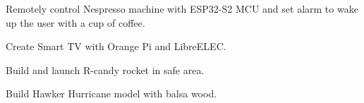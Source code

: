 \documentclass[10pt,a4paper,ragged2e,withhyper]{altacv}
\begin{document}
\begin{paracol}{2}
{\small Remotely control Nespresso machine with ESP32-S2 MCU and set alarm to wake up the user with a cup of coffee.}

\divider

\small Create Smart TV with Orange Pi and LibreELEC.

\divider

\small Build and launch R-candy rocket in safe area.

\divider

\small Build Hawker Hurricane model with balsa wood.










\divider

\divider

\divider











\end{paracol}
\end{document}
